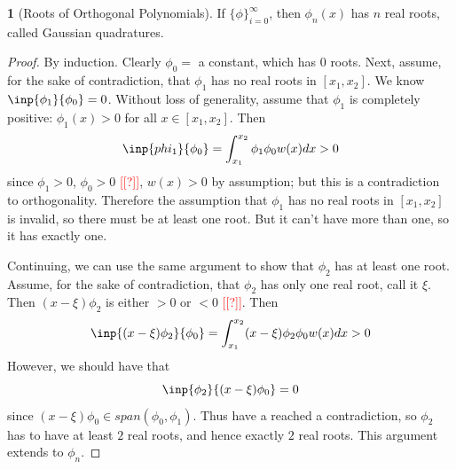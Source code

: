 \documentclass[12pt]{article}
\theoremstyle{definition}
\newtheorem{theorem}{\color{ForestGreen}{\textbf{Theorem}}}
\theoremstyle{definition}
\begin{document}
\begin{theorem}[Roots of Orthogonal Polynomials]
	If $\{\phi\}_{i=0}^\infty$, then $\phi_n(x)$ has $n$ real roots, called Gaussian quadratures. 
\end{theorem}
\begin{proof}
	By induction. Clearly $\phi_0 =$ a constant, which has $0$ roots. Next, assume, for the sake of contradiction, that $\phi_1$ has no real roots in $[x_1,x_2]$. We know $\inp{\phi_1}{\phi_0} = 0$. Without loss of generality, assume that $\phi_1$ is completely positive: $\phi_1(x) > 0$ for all $x \in [x_1,x_2]$. Then
	\begin{equation}
		\inp{phi_1}{\phi_0} = \int_{x_1}^{x_2} \phi_1 \phi_0 w(x) dx > 0
	\end{equation}
	since $\phi_1 > 0$, $\phi_0 > 0$ \textcolor{red}{[[?]]}, $w(x) > 0$ by assumption; but this is a contradiction to orthogonality. Therefore the assumption that $\phi_1$ has no real roots in $[x_1,x_2]$ is invalid, so there must be at least one root. But it can't have more than one, so it has exactly one. 

	Continuing, we can use the same argument to show that $\phi_2$ has at least one root. Assume, for the sake of contradiction, that $\phi_2$ has only one real root, call it $\xi$. Then $(x-\xi)\phi_2$ is either $> 0$ or $< 0$ \textcolor{red}{[[?]]}. Then 
	\begin{equation}
		\inp{(x-\xi)\phi_2}{\phi_0} = \int_{x_1}^{x_2} (x-\xi)\phi_2 \phi_0 w(x) dx > 0
	\end{equation}
	However, we should have that 
	\begin{equation}
		\inp{\phi_2}{(x-\xi)\phi_0} = 0
	\end{equation}
	since $(x-\xi)\phi_0 \in span(\phi_0,\phi_1)$. Thus have a reached a contradiction, so $\phi_2$ has to have at least $2$ real roots, and hence exactly $2$ real roots. This argument extends to $\phi_n$.
\end{proof}
\end{document}
